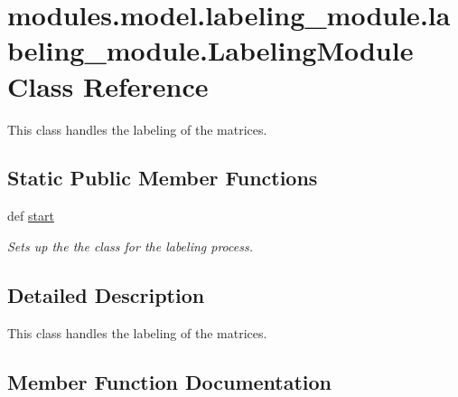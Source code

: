 \hypertarget{classmodules_1_1model_1_1labeling__module_1_1labeling__module_1_1_labeling_module}{}\section{modules.\+model.\+labeling\+\_\+module.\+labeling\+\_\+module.\+Labeling\+Module Class Reference}
\label{classmodules_1_1model_1_1labeling__module_1_1labeling__module_1_1_labeling_module}


This class handles the labeling of the matrices.  


\subsection*{Static Public Member Functions}
\begin{DoxyCompactItemize}
\item 
def \mbox{\hyperlink{classmodules_1_1model_1_1labeling__module_1_1labeling__module_1_1_labeling_module_ad62aae0768cc5dbab567c1764cd97402}{start}}
\begin{DoxyCompactList}\small\item\em Sets up the the class for the labeling process. \end{DoxyCompactList}\end{DoxyCompactItemize}


\subsection{Detailed Description}
This class handles the labeling of the matrices. 

\subsection{Member Function Documentation}
\mbox{\label{classmodules_1_1model_1_1labeling__module_1_1labeling__module_1_1_labeling_module_ad62aae0768cc5dbab567c1764cd97402}} 
